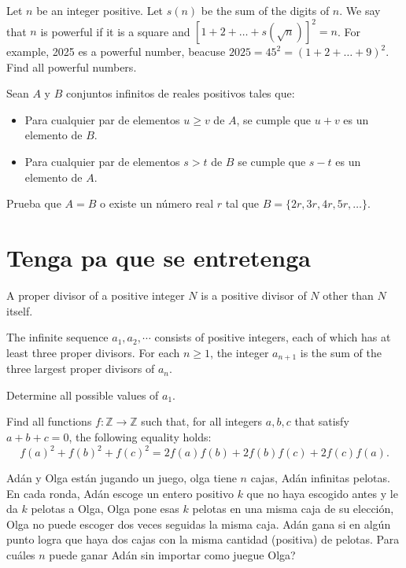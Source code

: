 \documentclass[11pt]{scrartcl}
\newcommand{\thmdifficulty}{0}
\newcommand{\problemdiff}[1]{\renewcommand{\thmdifficulty}{#1}}
\begin{document}
\problemdiff{4}

\begin{problem} %
Let $n$ be an integer positive. Let $s(n)$ be the sum of the digits of $n$. We say that $n$ is powerful if it is a square and $[1+2+\dots+s(\sqrt{n})]^2=n$. For example, 2025 es a powerful number, beacuse $2025=45^2=(1+2+\dots+9)^2$. Find all powerful numbers.
\end{problem}


\problemdiff{5}

\begin{problem} %
    Sean $A$ y $B$ conjuntos infinitos de reales positivos tales que:
    \begin{itemize}
        \item Para cualquier par de elementos $u \geq v$ de $A$, se cumple que $u+v$ es un elemento de $B$.
        \item Para cualquier par de elementos $s>t$ de $B$ se cumple que $s-t$ es un elemento de $A$. 
    \end{itemize}
    Prueba que $A=B$ o existe un número real $r$ tal que $B=\{ 2r,3r,4r,5r,\ldots \}$.
\end{problem}

\section{Tenga pa que se entretenga}

\problemdiff{5}
\begin{problem}
    	A proper divisor of a positive integer $N$ is a positive divisor of $N$ other than $N$ itself.

The infinite sequence $a_1, a_2, \cdots$ consists of positive integers, each of which has at least three proper divisors. For each $n\geq 1$, the integer $a_{n+1}$ is the sum of the three largest proper divisors of $a_n$.

Determine all possible values of $a_1$.
\end{problem}

\problemdiff{6}
\begin{problem}
    Find all functions $f:\mathbb Z\rightarrow \mathbb Z$ such that, for all integers $a,b,c$ that satisfy $a+b+c=0$, the following equality holds:
\[f(a)^2+f(b)^2+f(c)^2=2f(a)f(b)+2f(b)f(c)+2f(c)f(a).\]
\end{problem}

\problemdiff{6}
\begin{problem} %
    Adán y Olga están jugando un juego, olga tiene $n$ cajas, Adán infinitas pelotas. En cada ronda, Adán escoge un entero positivo $k$ que no haya escogido antes y le da $k$ pelotas a Olga, Olga pone esas $k$ pelotas en una misma caja de su elección, Olga no puede escoger dos veces seguidas la misma caja.
Adán gana si en algún punto logra que haya dos cajas con la misma cantidad (positiva) de pelotas. Para cuáles $n$ puede ganar Adán sin importar como juegue Olga?
\end{problem}
\end{document}
